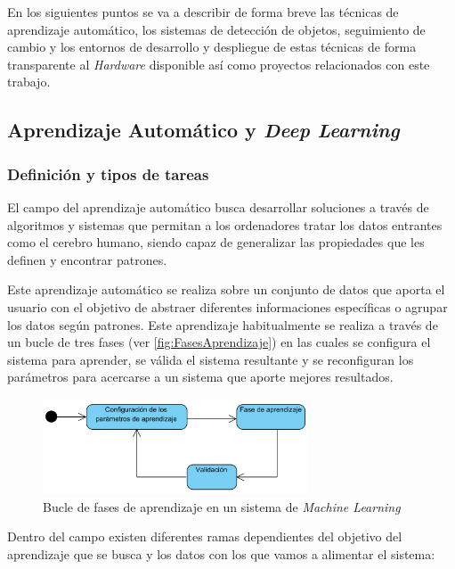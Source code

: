 En los siguientes puntos se va a describir de forma breve las técnicas de aprendizaje automático, los sistemas de detección de objetos, seguimiento de cambio y los entornos de desarrollo y despliegue 
de estas técnicas de forma transparente al \textit{Hardware} disponible así como proyectos relacionados con este trabajo.
\clearpage

\subsection{Aprendizaje Automático y \textit{Deep Learning}}

\subsubsection{Definición y tipos de tareas}

El campo del aprendizaje automático busca desarrollar soluciones a través de algoritmos y sistemas que permitan a los ordenadores tratar los datos entrantes como el cerebro humano, siendo capaz de 
generalizar las propiedades que les definen y encontrar patrones.

Este aprendizaje automático se realiza sobre un conjunto de datos que aporta el usuario con el objetivo de abstraer diferentes informaciones específicas o agrupar los datos según patrones. Este aprendizaje 
habitualmente se realiza a través de un bucle de tres fases (ver \autoref{fig:FasesAprendizaje}) en las cuales se configura el sistema para aprender, se válida el sistema resultante y se reconfiguran los parámetros para acercarse a un sistema 
que aporte mejores resultados.

\begin{figure}[H]
    \centering
    \includegraphics[width=0.7\textwidth]{images/4/Fases.png}
    \caption{Bucle de fases de aprendizaje en un sistema de \textit{Machine Learning}}
    \label{fig:FasesAprendizaje}
\end{figure}

Dentro del campo existen diferentes ramas dependientes del objetivo del aprendizaje que se busca y los datos con los que vamos a alimentar el sistema:

